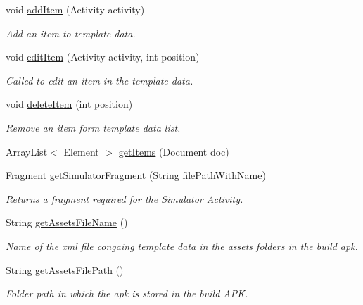 \begin{DoxyCompactItemize}
void \hyperlink{interfaceorg_1_1buildmlearn_1_1toolkit_1_1model_1_1TemplateInterface_a4b0102080f73bee8b91530e03e995311}{add\-Item} (Activity activity)
\begin{DoxyCompactList}\small\item\em Add an item to template data. \end{DoxyCompactList}\item 
void \hyperlink{interfaceorg_1_1buildmlearn_1_1toolkit_1_1model_1_1TemplateInterface_a5a28364a7250ae0a6f18f8173c9df871}{edit\-Item} (Activity activity, int position)
\begin{DoxyCompactList}\small\item\em Called to edit an item in the template data. \end{DoxyCompactList}\item 
void \hyperlink{interfaceorg_1_1buildmlearn_1_1toolkit_1_1model_1_1TemplateInterface_aeb65a5ef72b939c20b24cd7c02a80a97}{delete\-Item} (int position)
\begin{DoxyCompactList}\small\item\em Remove an item form template data list. \end{DoxyCompactList}\item 
Array\-List$<$ Element $>$ \hyperlink{interfaceorg_1_1buildmlearn_1_1toolkit_1_1model_1_1TemplateInterface_a9fb6e277f0ebfb2caea138017854473f}{get\-Items} (Document doc)
\item 
Fragment \hyperlink{interfaceorg_1_1buildmlearn_1_1toolkit_1_1model_1_1TemplateInterface_a9b7f8c39a34918a8832eec6b1eb1f3c0}{get\-Simulator\-Fragment} (String file\-Path\-With\-Name)
\begin{DoxyCompactList}\small\item\em Returns a fragment required for the Simulator Activity. \end{DoxyCompactList}\item 
String \hyperlink{interfaceorg_1_1buildmlearn_1_1toolkit_1_1model_1_1TemplateInterface_a5336064bba45a1ba2f6db891567e1b6e}{get\-Assets\-File\-Name} ()
\begin{DoxyCompactList}\small\item\em Name of the xml file congaing template data in the assets folders in the build apk. \end{DoxyCompactList}\item 
String \hyperlink{interfaceorg_1_1buildmlearn_1_1toolkit_1_1model_1_1TemplateInterface_ae35d1ab3f2c88b79d0d2a79cde81155b}{get\-Assets\-File\-Path} ()
\begin{DoxyCompactList}\small\item\em Folder path in which the apk is stored in the build A\-P\-K. \end{DoxyCompactList}\item 

\end{DoxyCompactItemize}
